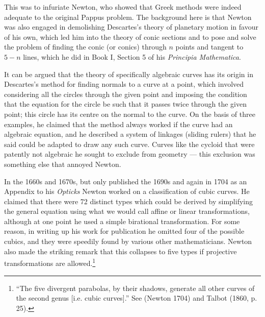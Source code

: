 \bigskip 


This was to infuriate Newton, who showed that Greek methods were indeed adequate to the original Pappus problem. The background here is that Newton was also engaged in demolishing Descartes's theory of planetary motion in favour of his own, which led him into the theory of conic sections and to pose and solve the problem of finding the conic (or conics) through $n$ points and tangent to $5-n$ lines, which he did in Book I, Section 5 of his \emph{Principia Mathematica}.~\label{Newtonconics}

It can be argued that the theory of specifically algebraic curves has its origin in Descartes's method for finding normals to a curve at a point, which  involved considering all the circles through the given point and imposing the condition that the equation for the circle be such that it passes twice through the given point; this circle has its centre on the normal to the curve. On the basis of three examples, he claimed that the method always worked  if the curve had an algebraic equation, and he described a system of linkages (sliding rulers) that he said could be adapted to draw any such curve. Curves like the cycloid that were patently not algebraic he sought to exclude from geometry --- this exclusion was something else that annoyed Newton.

In the 1660s and 1670s, but only published  the 1690s and again in 1704 as an Appendix to his \emph{Opticks} Newton worked on a classification of cubic curves. He claimed that there were 72 distinct types which could be derived by simplifying the general equation using what we would call affine or linear transformations, although at one point he used a simple birational transformation. For some reason, in writing up his work for publication he omitted four of the possible cubics, and they were speedily found by various other mathematicians.  Newton also made the striking remark that this collapses to five types if projective transformations are allowed.\footnote{``The five divergent parabolas, by their shadows, generate all other curves of the second genus [i.e. cubic curves].'' See (Newton  1704) and Talbot (1860, p. 25).}





